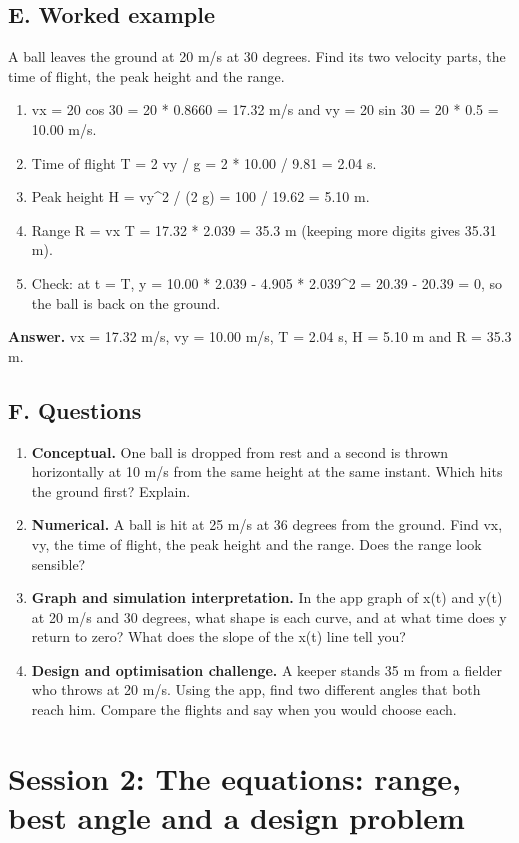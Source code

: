 \documentclass[11pt,a4paper]{article}
\begin{document}
\subsection*{E. Worked example}
A ball leaves the ground at 20 m/s at 30 degrees. Find its two velocity parts, the time of flight, the peak height and the range.
\begin{enumerate}[nosep]
\item vx = 20 cos 30 = 20 * 0.8660 = 17.32 m/s and vy = 20 sin 30 = 20 * 0.5 = 10.00 m/s.
\item Time of flight T = 2 vy / g = 2 * 10.00 / 9.81 = 2.04 s.
\item Peak height H = vy\textasciicircum{}2 / (2 g) = 100 / 19.62 = 5.10 m.
\item Range R = vx T = 17.32 * 2.039 = 35.3 m (keeping more digits gives 35.31 m).
\item Check: at t = T, y = 10.00 * 2.039 - 4.905 * 2.039\textasciicircum{}2 = 20.39 - 20.39 = 0, so the ball is back on the ground.
\end{enumerate}
\textbf{Answer.} vx = 17.32 m/s, vy = 10.00 m/s, T = 2.04 s, H = 5.10 m and R = 35.3 m.

\subsection*{F. Questions}
\begin{enumerate}[nosep]
\item \textbf{Conceptual.} One ball is dropped from rest and a second is thrown horizontally at 10 m/s from the same height at the same instant. Which hits the ground first? Explain.
\item \textbf{Numerical.} A ball is hit at 25 m/s at 36 degrees from the ground. Find vx, vy, the time of flight, the peak height and the range. Does the range look sensible?
\item \textbf{Graph and simulation interpretation.} In the app graph of x(t) and y(t) at 20 m/s and 30 degrees, what shape is each curve, and at what time does y return to zero? What does the slope of the x(t) line tell you?
\item \textbf{Design and optimisation challenge.} A keeper stands 35 m from a fielder who throws at 20 m/s. Using the app, find two different angles that both reach him. Compare the flights and say when you would choose each.
\end{enumerate}

\section{Session 2: The equations: range, best angle and a design problem}
\end{document}
